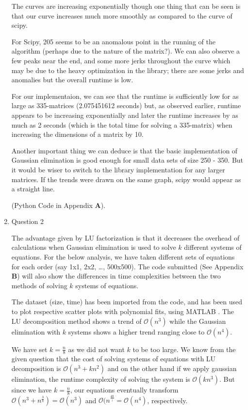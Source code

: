 \documentclass[a4paper, 11pt]{article}
\begin{document}
\begin{enumerate}
The curves are increasing exponentially though one thing that can be seen is that our curve increases much more smoothly as compared to the curve of scipy.

For Scipy,
205 seems to be an anomalous point in the running of the algorithm (perhaps due to the nature of the matrix?). We can also observe a few peaks near the end, and some more jerks throughout the curve which may be due to the heavy optimization in the library; there are some jerks and anomalies but the overall runtime is low.

For our implementaion, 
we can see that the runtime is sufficiently low for as large as 335-matrices (2.075451612 seconds) but, as observed earlier, runtime appears to be increasing exponentially and later the runtime increases by as much as 2 seconds (which is the total time for solving a 335-matrix) when increasing the dimensions of a matrix by 10.

Another important thing we can deduce is that the basic implementation of Gaussian elimination is good enough for small data sets of size 250 - 350. But it would be wiser to switch to the library implementation for any larger matrices. If the trends were drawn on the same graph, scipy would appear as a straight line.

(Python Code in Appendix \textbf{A}).
%

\item Question 2

The advantage given by LU factorization is that it decreases the overhead of calculations when Gaussian elimination is used to solve $k$ different systems of equations. For the below analysis, we have taken different sets of equations for each order (say 1x1, 2x2, …, 500x500). The code submitted (See Appendix \textbf{B}) will also show the differences in time complexities between the two methods of solving $k$ systems of equations.

The dataset (size, time) has been imported from the code, and has been used to plot respective scatter plots with polynomial fits, using MATLAB \cite{five}. The LU decomposition method shows a trend of $\mathcal{O}(n^3)$ while the Gaussian elimination with $k$ systems shows a higher trend ranging close to $\mathcal{O}(n^4)$.

We have set $k = \frac{n}{8}$ as we did not want $k$ to be too large. We know from the given question that the cost of solving systems of equations with LU decomposition is $\mathcal{O}(n^3 + kn^2)$ and on the other hand if we apply gaussian elimination, the runtime complexity of solving the system is $\mathcal{O}(kn^3)$. But since we have $k = \frac{n}{8}$, our equations eventually transform $\mathcal{O}(n^3 + n^{\frac{3}{8}}) = \mathcal{O}(n^3)$ and $\mathcal{O}(n^\frac{{4}{8}}) = \mathcal{O}(n^4)$, respectively.


\end{enumerate}
\end{document}
